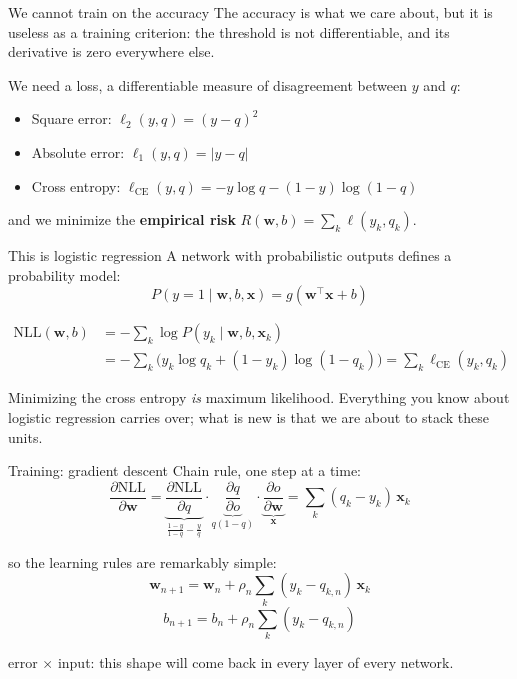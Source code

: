 \documentclass[aspectratio=169,10pt]{beamer}
\newcommand{\vx}{{\bm x}}
\newcommand{\vw}{{\bm w}}
\begin{document}
\begin{frame}{We cannot train on the accuracy}
The accuracy is what we care about, but it is useless as a training criterion: the
threshold is not differentiable, and its derivative is zero everywhere else.

We need a \alert{loss}, a differentiable measure of disagreement between $y$ and $q$:
\begin{itemize}
  \item Square error: $\ell_2(y,q) = (y-q)^2$
  \item Absolute error: $\ell_1(y,q) = |y-q|$
  \item \alert{Cross entropy}: $\ell_\text{CE}(y,q) = -y\log q - (1-y)\log(1-q)$
\end{itemize}
and we minimize the \textbf{empirical risk} $R(\vw,b) = \sum_k \ell(y_k,q_k)$.
\end{frame}

\begin{frame}{This is logistic regression}
A network with probabilistic outputs defines a probability model:
$$P(y=1\mid \vw,b,\vx) = g(\vw^\intercal\vx + b)$$

\begin{align*}
\text{NLL}(\vw,b) &= -\sum_k \log P(y_k\mid \vw,b,\vx_k) \\
                 &= -\sum_k \big(y_k\log q_k + (1-y_k)\log(1-q_k)\big)
                  = \sum_k \ell_\text{CE}(y_k,q_k)
\end{align*}

\begin{keybox}
Minimizing the cross entropy \emph{is} maximum likelihood. Everything you know about
logistic regression carries over; what is new is that we are about to stack these units.
\end{keybox}
\end{frame}

\begin{frame}{Training: gradient descent}
Chain rule, one step at a time:
$$\frac{\partial \text{NLL}}{\partial \vw}
  = \underbrace{\frac{\partial \text{NLL}}{\partial q}}_{\frac{1-y}{1-q}-\frac{y}{q}}
    \cdot \underbrace{\frac{\partial q}{\partial o}}_{q(1-q)}
    \cdot \underbrace{\frac{\partial o}{\partial \vw}}_{\vx}
  = \sum_k (q_k - y_k)\,\vx_k$$

so the learning rules are remarkably simple:
$$\vw_{n+1} = \vw_n + \rho_n \sum_k (y_k - q_{k,n})\,\vx_k $$ 
$$b_{n+1} = b_n + \rho_n \sum_k (y_k - q_{k,n})$$

\begin{center}\small
\alert{error $\times$ input}: this shape will come back in every layer of every network.
\end{center}
\end{frame}
\end{document}
